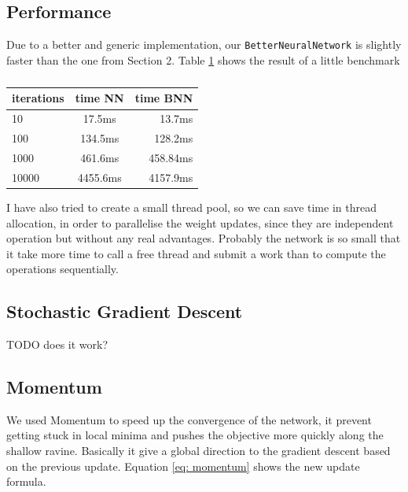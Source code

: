 \documentclass[11pt]{article}
\begin{document}
\subsection{Performance}
Due to a better and generic implementation, our \texttt{BetterNeuralNetwork} is slightly faster than the one from Section 2. Table \ref{table: performance_NN_BNN} shows the result of a little benchmark
\begin{table}[H]
	\label{table: performance_NN_BNN}
\centering
  \begin{tabular}{ | l | c | r |}
    \hline
    iterations & time NN & time BNN\\ \hline
    10 & 17.5ms  & 13.7ms \\ \hline
    100 & 134.5ms  & 128.2ms \\ 
    1000 & 461.6ms  & 458.84ms \\ \hline
    10000 & 4455.6ms & 4157.9ms \\ \hline    
  \end{tabular}
  \caption{}
\end{table}
I have also tried to create a small thread pool, so we can save time in thread allocation, in order to parallelise the weight updates, since they are independent operation but without any real advantages. Probably the network is so small that it take more time to call a free thread and submit a work than to compute the operations  sequentially.
\subsection{Stochastic Gradient Descent}
TODO does it work?
\subsection{Momentum}
We used Momentum to speed up the convergence of the network, it prevent getting stuck in local minima and pushes the objective more quickly along the shallow ravine. Basically it give a global direction to the gradient descent based on the previous update. Equation \ref{eq: momentum} shows the new update formula. 
\end{document}
